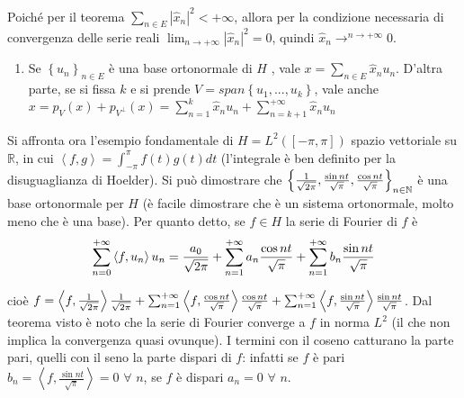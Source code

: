 \documentclass{article}
\begin{document}
Poich\'{e} per il teorema $\sum_{n\in E}\left\vert \hat{x}_{n}\right\vert
^{2}<+\infty $, allora per la condizione necessaria di convergenza delle
serie reali $\lim_{n\rightarrow +\infty }\left\vert \hat{x}_{n}\right\vert
^{2}=0$, quindi $\hat{x}_{n}\rightarrow ^{n\rightarrow +\infty }0$.

\begin{enumerate}
\item Se $\left\{ u_{n}\right\} _{n\in E}$ \`{e} una base ortonormale di $H$%
, vale $x=\sum_{n\in E}\hat{x}_{n}u_{n}$. D'altra parte, se si fissa $k$ e
si prende $V=span\left\{ u_{1},...,u_{k}\right\} $, vale anche $%
x=p_{V}\left( x\right) +p_{V^{\perp }}\left( x\right) =\sum_{n=1}^{k}\hat{x}%
_{n}u_{n}+\sum_{n=k+1}^{+\infty }\hat{x}_{n}u_{n}$
\end{enumerate}

Si affronta ora l'esempio fondamentale di $H=L^{2}\left( \left[ -\pi ,\pi %
\right] \right) $ spazio vettoriale su $%
\mathbb{R}
$, in cui $\left\langle f,g\right\rangle =\int_{-\pi }^{\pi }f\left(
t\right) g\left( t\right) dt$ (l'integrale \`{e} ben definito per la
disuguaglianza di Hoelder). Si pu\`{o} dimostrare che $\left\{ \frac{1}{%
\sqrt{2\pi }},\frac{\sin nt}{\sqrt{\pi }},\frac{\cos nt}{\sqrt{\pi }}%
\right\} _{n\in 
\mathbb{N}
}$ \`{e} una base ortonormale per $H$ (\`{e} facile dimostrare che \`{e} un
sistema ortonormale, molto meno che \`{e} una base). Per quanto detto, se $%
f\in H$ la serie di Fourier di $f$ \`{e}%
\begin{equation*}
\sum_{n=0}^{+\infty }\left\langle f,u_{n}\right\rangle u_{n}=\frac{a_{0}}{%
\sqrt{2\pi }}+\sum_{n=1}^{+\infty }a_{n}\frac{\cos nt}{\sqrt{\pi }}%
+\sum_{n=1}^{+\infty }b_{n}\frac{\sin nt}{\sqrt{\pi }}
\end{equation*}

cio\`{e} $f=\left\langle f,\frac{1}{\sqrt{2\pi }}\right\rangle \frac{1}{%
\sqrt{2\pi }}+\sum_{n=1}^{+\infty }\left\langle f,\frac{\cos nt}{\sqrt{\pi }}%
\right\rangle \frac{\cos nt}{\sqrt{\pi }}+\sum_{n=1}^{+\infty }\left\langle
f,\frac{\sin nt}{\sqrt{\pi }}\right\rangle \frac{\sin nt}{\sqrt{\pi }}$. Dal
teorema visto \`{e} noto che la serie di Fourier converge a $f$ in norma $%
L^{2}$ (il che non implica la convergenza quasi ovunque). I termini con il
coseno catturano la parte pari, quelli con il seno la parte dispari di $f$:
infatti se $f$ \`{e} pari $b_{n}=\left\langle f,\frac{\sin nt}{\sqrt{\pi }}%
\right\rangle =0$ $\forall $ $n$, se $f$ \`{e} dispari $a_{n}=0$ $\forall $ $%
n$.
\end{document}
